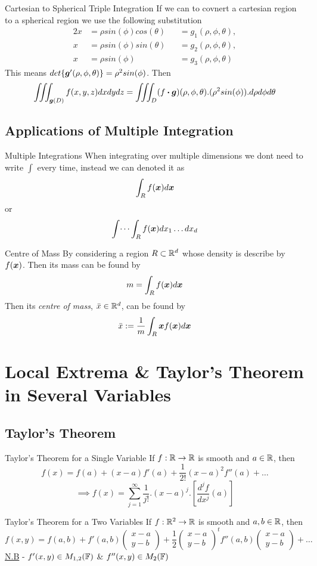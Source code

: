 \documentclass[11pt,a4paper]{article}
\begin{document}
\subtitle{Remark 14.05 - }{Cartesian to Spherical Triple Integration}
If we can to covnert a cartesian region to a spherical region we use the following substitution
\begin{alignat*}{2}
  x &= \rho sin(\phi) cos(\theta) &&= g_1(\rho, \phi, \theta), \\
  x &= \rho sin(\phi) sin(\theta) &&= g_2(\rho, \phi, \theta), \\
  x &= \rho sin(\phi) &&= g_3(\rho, \phi, \theta)
\end{alignat*}
This means $det\{ \boldsymbol{g}'(\rho, \phi, \theta) \} = \rho^2 sin(\phi)$. Then
$$\iiint_{\boldsymbol{g}(D)} f(x, y , z) dx dy dz = \iiint_D (f \boldsymbol{\cdot} \boldsymbol{g})(\rho, \phi, \theta).(\rho^2 sin(\phi)).d\rho d\phi d\theta$$

\subsection{Applications of Multiple Integration}

\subtitle{Definition 14.06 - }{Multiple Integrations}
When integrating over multiple dimensions we dont need to write $\int$ every time, instead we can denoted it as
$$\int_R f(\boldsymbol{x}) d\boldsymbol{x}$$
or
$$\int \dots \int_R f(\boldsymbol{x}) dx_1 \dots dx_d$$

\subtitle{Theorem 14.07 - }{Centre of Mass}
By considering a region $R \subset \mathbb{R}^d$ whose density is describe by $f(\boldsymbol{x})$. Then its mass can be found by
$$m = \int_R f(\boldsymbol{x})d\boldsymbol{x}$$
Then its \textit{centre of mass}, $\bar{x} \in \mathbb{R}^d$, can be found by $$\bar{x} := \frac{1}{m} \int_R \boldsymbol{x} f(\boldsymbol{x}) d\boldsymbol{x}$$

\section{Local Extrema \& Taylor's Theorem in Several Variables}

\subsection{Taylor's Theorem}

\subtitle{Theorem 15.01 - }{Taylor's Theorem for a Single Variable}
If $f : \mathbb{R} \to \mathbb{R}$ is smooth and $a \in \mathbb{R}$, then
$$f(x) = f(a) + (x-a)f'(a) + \frac{1}{2!}(x-a)^2f''(a) + \dots$$
$$\implies f(x) = \sum_{j=1}^{\infty} \frac{1}{j!}.(x-a)^j.\left[\frac{d^jf}{dx^j}(a)\right]$$

\subtitle{Theorem 15.02 - }{Taylor's Theorem for a Two Variables}
If $f : \mathbb{R}^2 \to \mathbb{R}$ is smooth and $a, b \in \mathbb{R}$, then
$$f(x, y) = f(a,b) + f'(a,b)\begin{pmatrix} x-a \\ y-b \end{pmatrix} + \frac{1}{2} \begin{pmatrix} x-a \\ y-b\end{pmatrix}^tf''(a,b)\begin{pmatrix} x-a \\ y-b\end{pmatrix} + \dots$$
\underline{N.B} - $f'(x,y) \in M_{1,2}(\mathbb{F})$ \& $f''(x,y) \in M_2(\mathbb{F})$
\end{document}
